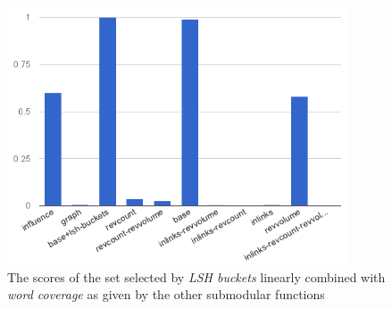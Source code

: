 \begin{figure}
  \centering
  \includegraphics[width=0.9\textwidth,natwidth=555,natheight=419]{images/wc+lsh.png}
  \caption{The scores of the set selected by \emph{\ac{LSH} buckets} linearly
  combined with \emph{word coverage} as given by the other submodular
  functions}
  \label{img:wc+lsh}
\end{figure}

